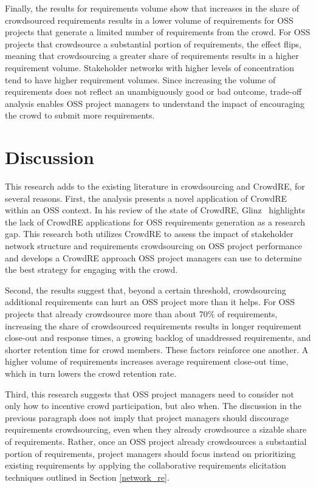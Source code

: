 Finally, the results for requirements volume show that increases in the share of crowdsourced requirements results in a lower volume of requirements for OSS projects that generate a limited number of requirements from the crowd. For OSS projects that crowdsource a substantial portion of requirements, the effect flips, meaning that crowdsourcing a greater share of requirements results in a higher requirement volume. Stakeholder networks with higher levels of concentration tend to have higher requirement volumes. Since increasing the volume of requirements does not reflect an unambiguously good or bad outcome, trade-off analysis enables OSS project managers to understand the impact of encouraging the crowd to submit more requirements.

\section{Discussion}

This research adds to the existing literature in crowdsourcing and CrowdRE, for several reasons. First, the analysis presents a novel application of CrowdRE within an OSS context. In his review of the state of CrowdRE, Glinz~\cite{glinz} highlights the lack of CrowdRE applications for OSS requirements generation as a research gap. This research both utilizes CrowdRE to assess the impact of stakeholder network structure and requirements crowdsourcing on OSS project performance and develops a CrowdRE approach OSS project managers can use to determine the best strategy for engaging with the crowd.

Second, the results suggest that, beyond a certain threshold, crowdsourcing additional requirements can hurt an OSS project more than it helps. For OSS projects that already crowdsource more than about 70\% of requirements, increasing the share of crowdsourced requirements results in longer requirement close-out and response times, a growing backlog of unaddressed requirements, and shorter retention time for crowd members. These factors reinforce one another. A higher volume of requirements increases average requirement close-out time, which in turn lowers the crowd retention rate.

Third, this research suggests that OSS project managers need to consider not only how to incentive crowd participation, but also when. The discussion in the previous paragraph does not imply that project managers should discourage requirements crowdsourcing, even when they already crowdsource a sizable share of requirements. Rather, once an OSS project already crowdsources a substantial portion of requirements, project managers should focus instead on prioritizing existing requirements by applying the collaborative requirements elicitation techniques outlined in Section \ref{network_re}.

